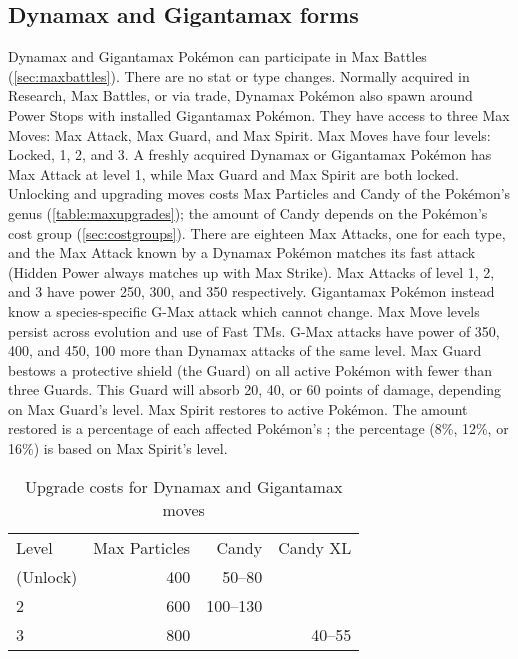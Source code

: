 \subsection{Dynamax and Gigantamax forms\label{sec:dmaxgmax}}
Dynamax and Gigantamax Pokémon can participate in Max Battles (\autoref{sec:maxbattles}).
There are no stat or type changes.
Normally acquired in Research, Max Battles, or via trade,
 Dynamax Pokémon also spawn around Power Stops with installed Gigantamax Pokémon.
They have access to three Max Moves: Max Attack, Max Guard, and Max Spirit.
Max Moves have four levels: Locked, 1, 2, and 3.
A freshly acquired Dynamax or Gigantamax Pokémon has Max Attack at level 1, while Max Guard and Max Spirit are both locked.
Unlocking and upgrading moves costs Max Particles and Candy of the Pokémon's genus (\autoref{table:maxupgrades});
 the amount of Candy depends on the Pokémon's cost group (\autoref{sec:costgroups}).
There are eighteen Max Attacks, one for each type, and the Max Attack known by a Dynamax Pokémon matches its fast attack
 (Hidden Power always matches up with Max Strike).
Max Attacks of level 1, 2, and 3 have power 250, 300, and 350 respectively.
Gigantamax Pokémon instead know a species-specific G-Max attack which cannot change.
Max Move levels persist across evolution and use of Fast TMs.
G-Max attacks have power of 350, 400, and 450, 100 more than Dynamax attacks of the same level.
Max Guard bestows a protective shield (the Guard) on all active Pokémon
  with fewer than three Guards.
This Guard will absorb 20, 40, or 60 points of damage, depending on Max Guard's level.
Max Spirit restores \HP{} to active Pokémon.
The amount restored is a percentage of each affected Pokémon's \MHP\@;
  the percentage (8\%, 12\%, or 16\%) is based on Max Spirit's level.
\begin{table}[b]
\centering
\begin{tabular}{lrrr}
Level & Max Particles & Candy & Candy XL\\
\Midrule
1 (Unlock) & 400 & 50--80 &\\
2          & 600 & 100--130 &\\
3          & 800 & & 40--55\\
\end{tabular}
\caption{Upgrade costs for Dynamax and Gigantamax moves\label{table:maxupgrades}}
\end{table}



